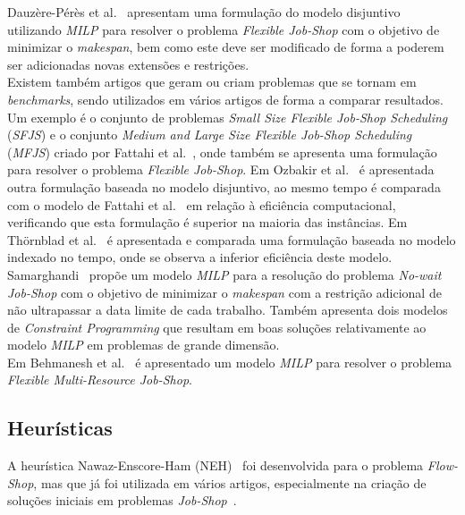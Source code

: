 Dauzère-Pérès et al.~\cite{dauzere-peresFlexibleJobShop2024} apresentam uma formulação do modelo disjuntivo utilizando \textit{MILP} para resolver o problema \textit{Flexible Job-Shop} com o objetivo de minimizar o \textit{makespan}, bem como este deve ser modificado de forma a poderem ser adicionadas novas extensões e restrições.\\

Existem também artigos que geram ou criam problemas que se tornam em \textit{benchmarks}, sendo utilizados em vários artigos de forma a comparar resultados. Um exemplo é o conjunto de problemas \textit{Small Size Flexible Job-Shop Scheduling} (\textit{SFJS}) e o conjunto \textit{Medium and Large Size Flexible Job-Shop Scheduling} (\textit{MFJS}) criado por Fattahi et al.~\cite{fattahiMathematicalModelingHeuristic2007}, onde também se apresenta uma formulação para resolver o problema \textit{Flexible Job-Shop}. Em Ozbakir et al.~\cite{ozguvenMathematicalModelsJobshop2010} é apresentada outra formulação baseada no modelo disjuntivo, ao mesmo tempo é comparada com o modelo de Fattahi et al.~\cite{fattahiMathematicalModelingHeuristic2007} em relação à eficiência computacional, verificando que esta formulação é superior na maioria das instâncias. Em Thörnblad et al.~\cite{Thrnblad2013ACI} é apresentada e comparada uma formulação baseada no modelo indexado no tempo, onde se observa a inferior eficiência deste modelo.\\

Samarghandi~\cite{samarghandiSolvingNowaitJob2019} propõe um modelo \textit{MILP} para a resolução do problema \textit{No-wait Job-Shop} com o objetivo de minimizar o \textit{makespan} com a restrição adicional de não ultrapassar a data limite de cada trabalho. Também apresenta dois modelos de \textit{Constraint Programming} que resultam em boas soluções relativamente ao modelo \textit{MILP} em problemas de grande dimensão.\\

Em Behmanesh et al.~\cite{behmaneshImprovedAntColony2021} é apresentado um modelo \textit{MILP} para resolver o problema \textit{Flexible Multi-Resource Job-Shop}.

\subsection{Heurísticas}

A heurística Nawaz-Enscore-Ham (NEH)~\cite{nawazHeuristicAlgorithmMmachine1983} foi desenvolvida para o problema \textit{Flow-Shop}, mas que já foi utilizada em vários artigos, especialmente na criação de soluções iniciais em problemas \textit{Job-Shop}~\cite{yingMinimizingTotalCompletion2022, xuNoWaitJobShop2021}.\\

